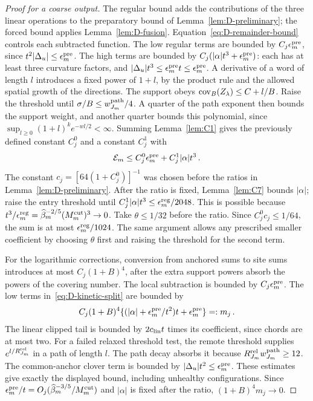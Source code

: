 \begin{proof}[Proof for a coarse output]
The regular bound adds the contributions of the three linear operations to the preparatory bound of Lemma~\ref{lem:D-preliminary}; the forced bound applies Lemma~\ref{lem:D-fusion}. Equation~\eqref{eq:D-remainder-bound} controls each subtracted function. The low regular terms are bounded by $C_j\epsilon^{\rm pre}_m$, since $t^2|\Delta_u|\le \epsilon^{\rm pre}_m$. The high terms are bounded by $C_j(|\alpha|t^3+\epsilon^{\rm pre}_m)$: each has at least three curvature factors, and $|\Delta_u|t^3\le \epsilon^{\rm pre}_mt\le \epsilon^{\rm pre}_m$. A derivative of a word of length $l$ introduces a fixed power of $1+l$, by the product rule and the allowed spatial growth of the directions. The support obeys $\operatorname{cov}_B(Z_\lambda)\le C+l/B$. Raise the threshold until $\sigma/B\le w^{\rm path}_{J_m}/4$. A quarter of the path exponent then bounds the support weight, and another quarter bounds this polynomial, since $\sup_{l\ge0}(1+l)^ke^{-wl/2}<\infty$. Summing Lemma~\ref{lem:C1} gives the previously defined constant $C_j^0$ and a constant $C_j^1$ with
\begin{equation*}
\mathcal E_m\le C_j^0\epsilon^{\rm pre}_m+C_j^1|\alpha|t^3\,.
\end{equation*}
The constant $c_j=[64(1+C_j^0)]^{-1}$ was chosen before the ratios in Lemma~\ref{lem:D-preliminary}. After the ratio is fixed, Lemma~\ref{lem:C7} bounds $|\alpha|$; raise the entry threshold until $C_j^1|\alpha|t^3\le\epsilon_m^{\rm reg}/2048$. This is possible because $t^3/\epsilon_m^{\rm reg}=\widehat{\beta}_m^{-2/5}(M^{\mathrm{cut}}_m)^3\to0$. Take $\theta\le1/32$ before the ratio. Since $C_j^0c_j\le1/64$, the sum is at most $\epsilon_m^{\rm reg}/1024$. The same argument allows any prescribed smaller coefficient by choosing $\theta$ first and raising the threshold for the second term.

For the logarithmic corrections, conversion from anchored sums to site sums introduces at most $C_j(1+B)^4$, after the extra support powers absorb the powers of the covering number. The local subtraction is bounded by $C_j\epsilon^{\rm pre}_m$. The low terms in~\eqref{eq:D-kinetic-split} are bounded by
\begin{equation*}
C_j(1+B)^4\{(|\alpha|+\epsilon^{\rm pre}_m/t^2)t+\epsilon^{\rm pre}_m\}=:m_j\,.
\end{equation*}
The linear clipped tail is bounded by $2c_{\rm lin}t$ times its coefficient, since chords are at most two. For a failed relaxed threshold test, the remote threshold supplies $e^{l/R_{J_m}^{\rm rel}}$ in a path of length $l$. The path decay absorbs it because $R_{J_m}^{\rm rel}w_{J_m}^{\rm path}\ge12$. The common-anchor clover term is bounded by $|\Delta_u|t^2\le \epsilon^{\rm pre}_m$. These estimates give exactly the displayed bound, including unhealthy configurations. Since $\epsilon^{\rm pre}_m/t=O_j(\widehat{\beta}_m^{-3/5}/M^{\mathrm{cut}}_m)$ and $|\alpha|$ is fixed after the ratio, $(1+B)^4m_j\to0$.


\end{proof}
